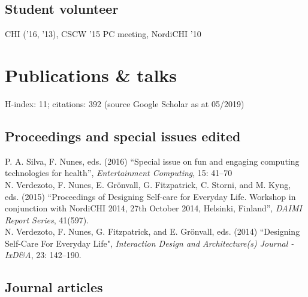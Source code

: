 \documentclass[11pt, a4paper]{article} %
\newcommand{\years}[1]{\marginnote{\scriptsize #1}} %
\begin{document}
\subsection*{Student volunteer}

CHI ('16, '13), CSCW '15 PC meeting, NordiCHI '10

\break





\section*{Publications \& talks}

H-index: 11; citations: 392 (source Google Scholar as at 05/2019)

\subsection*{Proceedings and special issues edited}

\years{2016}P. A. Silva, F. Nunes, eds. (2016) ``Special issue on fun and engaging computing technologies for health'', \emph{Entertainment Computing}, 15: 41--70\\
\years{2015}N. Verdezoto, F. Nunes, E. Grönvall, G. Fitzpatrick, C. Storni, and M. Kyng, eds. (2015) ``Proceedings of Designing Self-care for Everyday Life. Workshop in conjunction with NordiCHI 2014, 27th October 2014, Helsinki, Finland'', \emph{DAIMI Report Series}, 41(597).\\
\years{2014}N. Verdezoto, F. Nunes, G. Fitzpatrick, and E. Grönvall, eds. (2014) ``Designing Self-Care For Everyday Life", \emph{Interaction Design and Architecture(s) Journal - IxD\&A}, 23: 142--190.

\subsection*{Journal articles}
\end{document}
